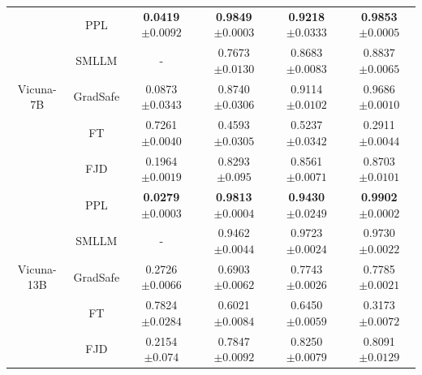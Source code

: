 \documentclass{article}
\begin{document}
\begin{table}[t]
\begin{tabular}{cccccc}
    \midrule
    \multirow{5}{*}{Vicuna-7B} 
    & PPL & \textbf{0.0419}\tiny{$\pm 0.0092$} & \textbf{0.9849}\tiny{$\pm 0.0003$} & \textbf{0.9218}\tiny{$\pm 0.0333$} & \textbf{0.9853}\tiny{$\pm 0.0005$} \\
    & SMLLM & - & 0.7673\tiny{$\pm 0.0130$} & 0.8683\tiny{$\pm 0.0083$} & 0.8837\tiny{$\pm 0.0065$} \\
    & GradSafe & 0.0873\tiny{$\pm 0.0343$} & 0.8740\tiny{$\pm 0.0306$} & 0.9114\tiny{$\pm 0.0102$} & 0.9686\tiny{$\pm 0.0010$}     \\
    & FT & 0.7261\tiny{$\pm 0.0040$} & 0.4593\tiny{$\pm 0.0305$} & 0.5237\tiny{$\pm 0.0342$} & 0.2911\tiny{$\pm 0.0044$} \\
    & FJD & 0.1964\tiny{$\pm 0.0019$} & 0.8293\tiny{$\pm 0.095$} & 0.8561\tiny{$\pm 0.0071$} & 0.8703\tiny{$\pm 0.0101$}  \\
    \midrule
    \multirow{5}{*}{Vicuna-13B} 
    & PPL  & \textbf{0.0279}\tiny{$\pm 0.0003$} & \textbf{0.9813}\tiny{$\pm 0.0004$} & \textbf{0.9430}\tiny{$\pm 0.0249$} & \textbf{0.9902}\tiny{$\pm 0.0002$} \\
    & SMLLM & - & 0.9462\tiny{$\pm 0.0044$} & 0.9723\tiny{$\pm 0.0024$} & 0.9730\tiny{$\pm 0.0022$} \\
    & GradSafe & 0.2726\tiny{$\pm 0.0066$} & 0.6903\tiny{$\pm 0.0062$} & 0.7743\tiny{$\pm 0.0026$} & 0.7785\tiny{$\pm 0.0021$}   \\
    & FT & 0.7824\tiny{$\pm 0.0284$} & 0.6021\tiny{$\pm 0.0084$} & 0.6450\tiny{$\pm 0.0059$} & 0.3173\tiny{$\pm 0.0072$} \\
    & FJD & 0.2154\tiny{$\pm 0.074$} & 0.7847\tiny{$\pm 0.0092$} & 0.8250\tiny{$\pm 0.0079$} & 0.8091\tiny{$\pm 0.0129$} \\
    

\end{tabular}
\end{table}
\end{document}
